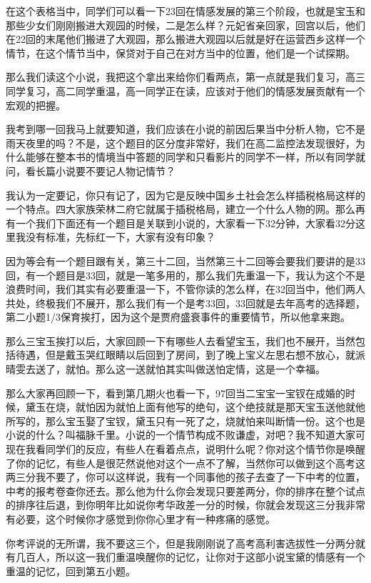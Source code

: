 \documentclass{ctexart}
\renewcommand{\\}{\par}
\begin{document}
在这个表格当中，同学们可以看一下23回在情感发展的第三个阶段，也就是宝玉和那些少女们刚刚搬进大观园的时候，二是怎么样？元妃省亲回家，回宫以后，他们在22回的末尾他们搬进了大观园，那么搬进大观园以后就是好在运营西乡这样一个情节，在这个情节当中，保贷对于自己在对方当中的位置，他们是一个试探期。

那么我们读这个小说，我把这个拿出来给你们看两点，第一点就是我们复习，高三同学复习，高二同学重温，高一同学正在读，应该对于他们的情感发展贡献有一个宏观的把握。

我考到哪一回我马上就要知道，我们应该在小说的前因后果当中分析人物，它不是雨天夜里的吗？不是，这个题目的区分度非常好，我们在高二监控法发现很好，为什么能够在整本书的情境当中答题的同学和只看影片的同学不一样，所以有同学就问，看长篇小说要不要记人物记情节？

我认为一定要记，你只有记了，因为它是反映中国乡土社会怎么样插税格局这样的一个特点。四大家族荣林二府它就属于插税格局，建立一个什么人物的网。那么再有一个我们下面还有一个题目是关联到小说的，大家看一下32分钟，大家看32分这里我没有标准，先标红一下，大家有没有印象？

因为等会有一个题目跟有关，第三十二回，当然第三十二回等会要我们要讲的是33回，有一个题目是33回，就是一笔多用的，那么我们先重温一下，我认为这个不是浪费时间，我们其实有必要重温一下，不管你读的怎么样，在32回当中，他们两人共处，终极我们不展开，那么我们有一个是考33回，33回就是去年高考的选择题，第二小题1/3保育挨打，因为这个是贾府盛衰事件的重要情节，所以他拿来跑。

那么三宝玉挨打以后，大家回顾一下有哪些人去看望宝玉，我们也不展开，当然包括待遇，但是戴玉哭红眼睛以后回到了房间，到了晚上宝义左思右想不放心，就派晴雯去送了，就怕。那么这一送就怕其实叫做送怕定情，这是一个幸福。

那么大家再回顾一下，看到第几期火也看一下，97回当二宝宝一宝钗在成婚的时候，黛玉在烧，就怕因为就怕上面有他写的绝句，这个绝技就是那天宝玉送他就他所写的，那么宝玉娶了宝钗，黛玉只有一死了之，烧就怕来叫断情一份。这个也是小说的什么？叫福脉千里。小说的一个情节构成不败谦虚，对吧？我不知道大家可现在我看同学们的反应，有些人在看着点点，说明什么呢？你对这个情节你是唤醒了你的记忆，有些人是很茫然说他对这个一点不了解，当然你可以做到这个高考这两三分我不要了，你可以这样说，我有一个同事他的孩子去查了一下中考的位置，中考的报考卷查你还去。那么他为什么你会发现只要差两分，你的排序在整个试点的排序往后退，到你明年比如说你考华政差一分的时候，你就会发现这三分我非常有必要，这个时候你才感觉到你你心里才有一种疼痛的感觉。

你考评说的无所谓，我不要这三个，但是我刚刚说了高考高利害选拔性一分两分就有几百人，所以这一我们重温唤醒你的记忆，让你对于这部小说宝黛的情感有一个重温的记忆，回到第五小题。
\end{document}
